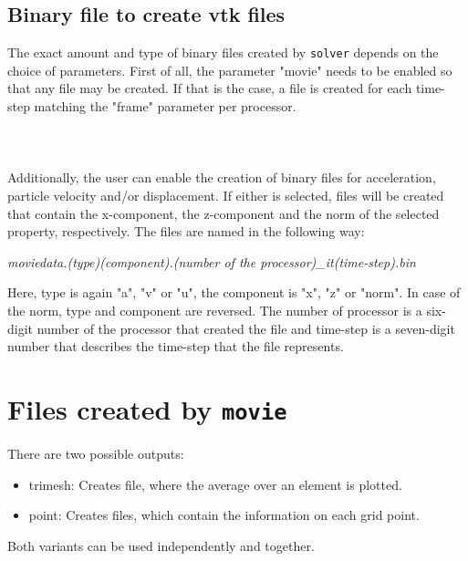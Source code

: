 		\subsection{Binary file to create vtk files}
		\label{subsec:binvtk}
			The exact amount and type of binary files created by \texttt{solver} depends on the choice of parameters. First of all, the parameter "movie" needs to be enabled so that any file may be created. If that is the case, a file is created for each time-step matching the "frame" parameter per processor. \\
			\\
			 \\
			\\
			Additionally, the user can enable the creation of binary files for acceleration, particle velocity and/or displacement. If either is selected, files will be created that contain the x-component, the z-component and the norm of the selected property, respectively. The files are named in the following way:
			\begin{center}%
				\emph{moviedata.(type)(component).(number of the processor)\_it(time-step).bin}
			\end{center} 
			Here, type is again "a", "v" or "u", the component is "x", "z" or "norm". In case of the norm, type and component are reversed. The number of processor is a six-digit number of the processor that created the file and time-step is a seven-digit number that describes the time-step that the file represents. \\

			
	\section{Files created by \texttt{movie}}
	\label{sec:movieout}
		There are two possible outputs: 
		\begin{itemize}
			\item trimesh: Creates file, where the average  over an element is plotted.
			\item point: Creates files, which contain the information on each grid point.
		\end{itemize}
		Both variants can be used independently and together.
					
